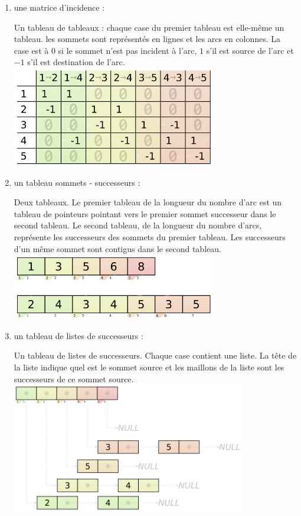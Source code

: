 \documentclass[11pt, a4paper]{report}
\begin{document}
	\begin{enumerate}
		\item une matrice d'incidence :
		
		Un tableau de tableaux : chaque case du premier tableau est elle-même un tableau. les sommets sont représentés en lignes et les arcs en colonnes. La case est à $0$ si le sommet n'est pas incident à l'arc, $1$ s'il est source de l'arc et $-1$ s'il est destination de l'arc.\\
		\includegraphics[width=0.7\textwidth]{images/Matrice_incidence.png}\\
		
		\item un tableau sommets - successeurs :
		
		Deux tableaux. Le premier tableau de la longueur du nombre d'arc est un tableau de pointeurs pointant vers le premier sommet successeur dans le second tableau. Le second tableau, de la longueur du nombre d'arcs, représente les successeurs des sommets du premier tableau. Les successeurs d'un même sommet sont contigus dans le second tableau.\\
		\includegraphics[width=0.7\textwidth]{images/tableau_pointeur_succ.png}\\
		
		\item un tableau de listes de successeurs :
		
		Un tableau de listes de successeurs. Chaque case contient une liste. La tête de la liste indique quel est le sommet source et les maillons de la liste sont les successeurs de ce sommet source.\\
		\includegraphics[width=0.8\textwidth]{images/tableau_liste_succ.png}\\
		
	\end{enumerate}
	
\end{document}
